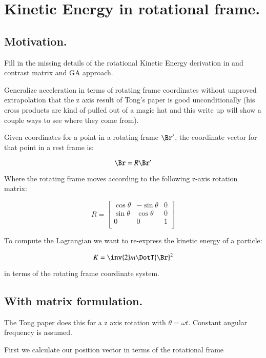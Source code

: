 \chapter{Kinetic Energy in rotational frame.}\label{chap:PJKeRot}

\section{Motivation. }

Fill in the missing details of the rotational Kinetic Energy derivation in
\cite{TongDynamics}
and contrast matrix and GA approach.

Generalize acceleration in terms
of rotating frame coordinates without unproved extrapolation that the z axis result
of Tong's paper is good unconditionally (his cross products are kind of pulled out of
a magic hat and this write up will show a couple ways to see where they come from).

Given coordinates for a point in a rotating frame $\Br'$, the coordinate vector for that point
in a rest frame is:

\begin{equation}\label{eqn:keRot:rotcoord}
\Br = R \Br'
\end{equation}

Where the rotating frame moves according to the following z-axis rotation matrix:

\[
R = 
\begin{bmatrix}
\cos \theta & -\sin \theta & 0 \\
\sin \theta & \cos \theta & 0 \\
0 & 0 & 1 \\
\end{bmatrix}
\]

To compute the Lagrangian we want to re-express the 
kinetic energy of a particle:

\[
K = 
\inv{2} m \DotT{\Br}^2
\]

in terms of the rotating frame coordinate system.

\section{With matrix formulation. }

The Tong paper does this for a z axis rotation with $\theta = \omega t$.
Constant angular frequency is assumed.

First we calculate our position vector in terms of the rotational frame

